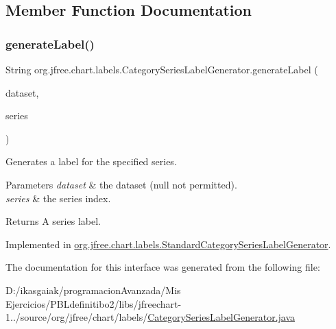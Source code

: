 \subsection{Member Function Documentation}
\mbox{\label{interfaceorg_1_1jfree_1_1chart_1_1labels_1_1_category_series_label_generator_a7b6ff7a5a11c77b3a2cede3b31dd314f}} 
\subsubsection{\texorpdfstring{generate\+Label()}{generateLabel()}}
{\footnotesize\ttfamily String org.\+jfree.\+chart.\+labels.\+Category\+Series\+Label\+Generator.\+generate\+Label (\begin{DoxyParamCaption}\item[{\mbox{\hyperlink{interfaceorg_1_1jfree_1_1data_1_1category_1_1_category_dataset}{Category\+Dataset}}}]{dataset,  }\item[{int}]{series }\end{DoxyParamCaption})}

Generates a label for the specified series.


\begin{DoxyParams}{Parameters}
{\em dataset} & the dataset ({\ttfamily null} not permitted). \\
\hline
{\em series} & the series index.\\
\hline
\end{DoxyParams}
\begin{DoxyReturn}{Returns}
A series label. 
\end{DoxyReturn}


Implemented in \mbox{\hyperlink{classorg_1_1jfree_1_1chart_1_1labels_1_1_standard_category_series_label_generator_a9aeba3bfd749fa93a0477811d56b339a}{org.\+jfree.\+chart.\+labels.\+Standard\+Category\+Series\+Label\+Generator}}.



The documentation for this interface was generated from the following file\+:\begin{DoxyCompactItemize}
\item 
D\+:/ikasgaiak/programacion\+Avanzada/\+Mis Ejercicios/\+P\+B\+Ldefinitibo2/libs/jfreechart-\/1../source/org/jfree/chart/labels/\mbox{\hyperlink{_category_series_label_generator_8java}{Category\+Series\+Label\+Generator.\+java}}\end{DoxyCompactItemize}
